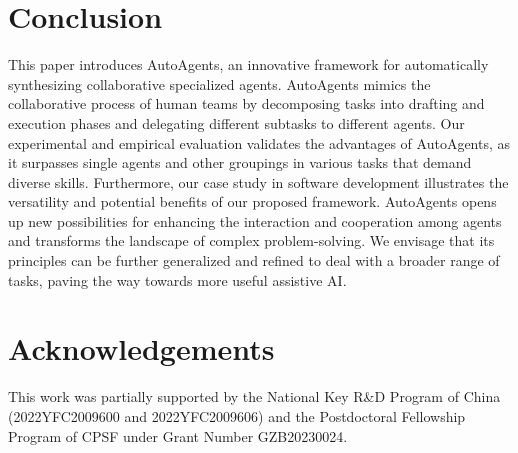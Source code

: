 \section{Conclusion}
This paper introduces AutoAgents, an innovative framework for automatically synthesizing collaborative specialized agents. AutoAgents mimics the collaborative process of human teams by decomposing tasks into drafting and execution phases and delegating different subtasks to different agents. Our experimental and empirical evaluation validates the advantages of AutoAgents, as it surpasses single agents and other groupings in various tasks that demand diverse skills. Furthermore, our case study in software development illustrates the versatility and potential benefits of our proposed framework. AutoAgents opens up new possibilities for enhancing the interaction and cooperation among agents and transforms the landscape of complex problem-solving.  We envisage that its principles can be further generalized and refined to deal with a broader range of tasks, paving the way towards more useful assistive AI.

\section{Acknowledgements}
This work was partially supported by the National Key R\&D Program of China (2022YFC2009600 and 2022YFC2009606) and the Postdoctoral Fellowship Program of CPSF under Grant Number GZB20230024.